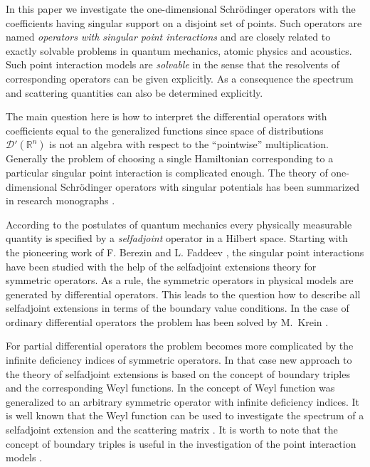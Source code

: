 \documentclass[11pt,english]{amsart}
\begin{document}
In this paper we investigate the one-dimensional Schr\"{o}dinger operators with the coefficients having singular support on a disjoint set of points. Such ope\-rators are named \textit{operators with singular point interactions} and are closely related to exactly solvable problems in quantum mechanics, atomic physics and acoustics.
Such point interaction models are \textit{solvable} in the sense that the resolvents of corresponding operators can be given explicitly. As a consequence the spectrum and scattering quantities can also be determined explicitly.

The main question here is how to interpret the differential operators with coefficients equal to the generalized functions since  space of distributions  $\mathcal{D}'(\mathbb{R}^n)$ is not
an algebra with respect to the ``pointwise'' multiplication. Generally the problem of choosing a single Hamiltonian corresponding to a particular singular point interaction is complicated enough.
The theory of one-dimensional Schr\"{o}dinger operators with singular potentials has been summarized in research monographs \cite{Albeverio2edition, AlbeverioKurasov}.

According to the postulates of quantum mechanics every physically measurable quantity is specified by a \textit{selfadjoint} operator in a Hilbert space. Starting with  the pioneering work of F. Berezin and L. Faddeev \cite{BerezinFadeev}, the singular point interactions
 have been studied with the help of the selfadjoint extensions theory for symmetric
operators.
As a rule, the symmetric operators in physical models are generated by differential operators.
This leads to the question how to describe all selfadjoint extensions in terms of the boundary value conditions.
In the case of ordinary differential operators the problem has been solved by M.~Krein \cite{AkhiezerGlazman, Krein}.

For partial differential operators the problem becomes more complicated by the infinite deficiency indices of symmetric operators. In that case new approach to the theory of selfadjoint extensions is based on
the concept of boundary triples \cite{Gorbachuky, GorbachukyKochubej} and the corresponding Weyl
functions. In \cite{DerkachMalamud1, DerkachMalamud2} the concept of Weyl function
was generalized to an arbitrary symmetric operator  with infinite deficiency indices.
It is well known that the Weyl function can be used to investigate the spectrum of a selfadjoint extension
and the scattering matrix \cite{BrascheMalamudNeidhardt2002}.
It is worth to note that the concept of boundary triples is useful in the investigation of the point interaction mo\-dels \cite{GoloschapovaOridoroga, KochubeyUMZh1989,
KochubeySibMatZh1991, KochubeyMatNotes1979}.
\end{document}
